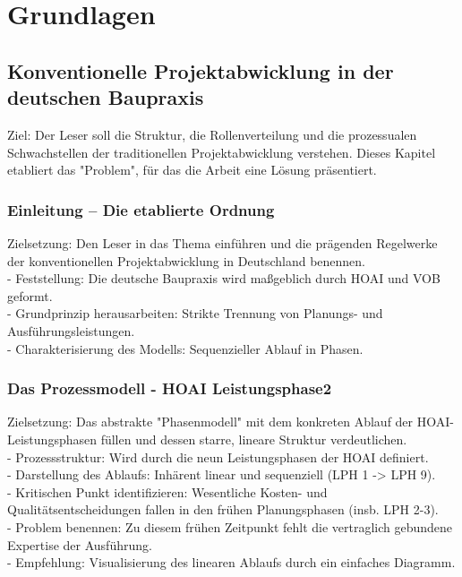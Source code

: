 \chapter{Grundlagen}
\label{ch:grundlagen}


\section{Konventionelle Projektabwicklung in der deutschen Baupraxis}
\label{sec: 2.1}
Ziel: Der Leser soll die Struktur, die Rollenverteilung und die prozessualen Schwachstellen der traditionellen Projektabwicklung verstehen. Dieses Kapitel etabliert das "Problem", für das die Arbeit eine Lösung präsentiert.

\subsection{Einleitung -- Die etablierte Ordnung}
\label{sec: 2.1.1}
Zielsetzung: Den Leser in das Thema einführen und die prägenden Regelwerke der konventionellen Projektabwicklung in Deutschland benennen.\\
- Feststellung: Die deutsche Baupraxis wird maßgeblich durch HOAI und VOB geformt.\\
- Grundprinzip herausarbeiten: Strikte Trennung von Planungs- und Ausführungsleistungen.\\
- Charakterisierung des Modells: Sequenzieller Ablauf in Phasen.\\

\subsection{Das Prozessmodell - HOAI Leistungsphase2}
\label{sec: 2.1.2}
Zielsetzung: Das abstrakte "Phasenmodell" mit dem konkreten Ablauf der HOAI-Leistungsphasen füllen und dessen starre, lineare Struktur verdeutlichen.\\
- Prozessstruktur: Wird durch die neun Leistungsphasen der HOAI definiert.\\
- Darstellung des Ablaufs: Inhärent linear und sequenziell (LPH 1 -> LPH 9).\\
- Kritischen Punkt identifizieren: Wesentliche Kosten- und Qualitätsentscheidungen fallen in den frühen Planungsphasen (insb. LPH 2-3).\\
- Problem benennen: Zu diesem frühen Zeitpunkt fehlt die vertraglich gebundene Expertise der Ausführung.\\
- Empfehlung: Visualisierung des linearen Ablaufs durch ein einfaches Diagramm.\\

